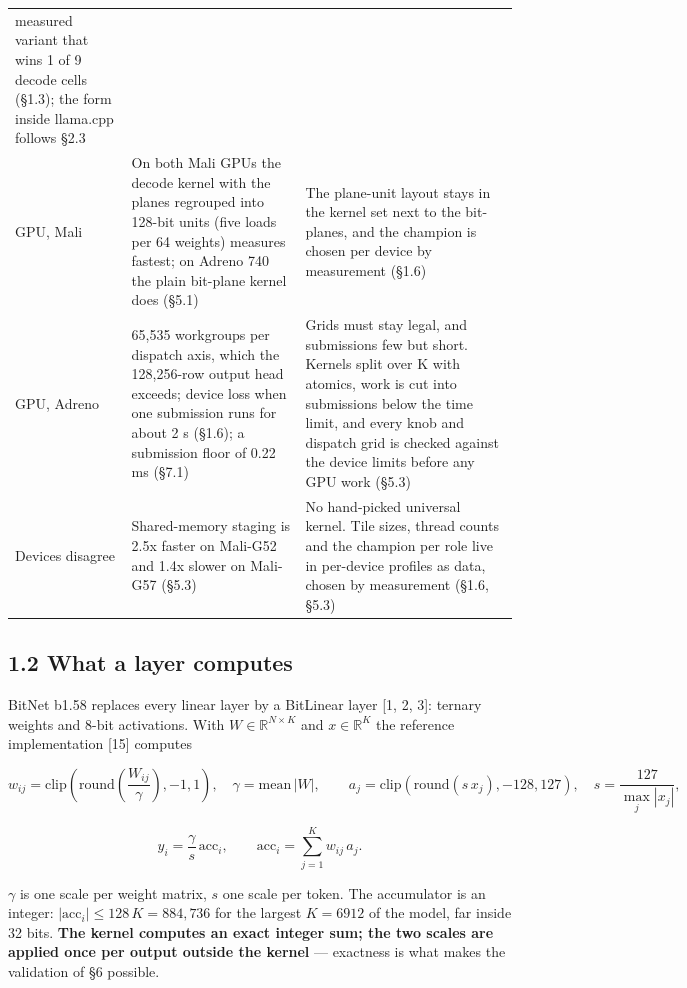 \documentclass[
  10pt,
]{article}
\begin{document}
{\begin{longtable}[]{@{}p{2.2cm}p{5.9cm}p{7.9cm}@{}}
measured variant that wins 1 of 9 decode cells (\S{}1.3); the form
inside llama.cpp follows \S{}2.3 \\
GPU, Mali & On both Mali GPUs the decode kernel with the planes
regrouped into 128-bit units (five loads per 64 weights) measures
fastest; on Adreno 740 the plain bit-plane kernel does (\S{}5.1) & The
plane-unit layout stays in the kernel set next to the bit-planes, and
the champion is chosen per device by measurement (\S{}1.6) \\
GPU, Adreno & 65,535 workgroups per dispatch axis, which the 128,256-row
output head exceeds; device loss when one submission runs for about 2 s
(\S{}1.6); a submission floor of 0.22 ms (\S{}7.1) & Grids must stay
legal, and submissions few but short. Kernels split over K with atomics,
work is cut into submissions below the time limit, and every knob and
dispatch grid is checked against the device limits before any GPU work
(\S{}5.3) \\
Devices disagree & Shared-memory staging is 2.5x faster on Mali-G52 and
1.4x slower on Mali-G57 (\S{}5.3) & No hand-picked universal kernel.
Tile sizes, thread counts and the champion per role live in per-device
profiles as data, chosen by measurement (\S{}1.6, \S{}5.3) \\
\end{longtable}
}

\subsection{1.2 What a layer computes}\label{what-a-layer-computes}

BitNet b1.58 replaces every linear layer by a BitLinear layer [1, 2,
3]: ternary weights and 8-bit activations. With
\(W \in\mathbb{R}^{N \times K}\) and \(x \in\mathbb{R}^{K}\) the
reference implementation [15] computes

\[
w_{ij} = \mathrm{clip}\left(\mathrm{round}\left(\frac{W_{ij}}{\gamma}\right), -1, 1\right),
\quad\gamma= \mathrm{mean}\,|W|, \qquad
a_j = \mathrm{clip}(\mathrm{round}(s\,x_j), -128, 127), \quad s = \frac{127}{\max_j |x_j|},
\]

\[
y_i = \frac{\gamma}{s}\,\mathrm{acc}_i, \qquad\mathrm{acc}_i = \sum_{j=1}^{K} w_{ij}\,a_j .
\]

\(\gamma\) is one scale per weight matrix, \(s\) one scale per token.
The accumulator is an integer:
\(|\mathrm{acc}_i| \le128\,K = 884{,}736\) for the largest \(K = 6912\)
of the model, far inside 32 bits. \textbf{The kernel computes an exact
integer sum; the two scales are applied once per output outside the
kernel} --- exactness is what makes the validation of \S{}6 possible.
\end{document}
